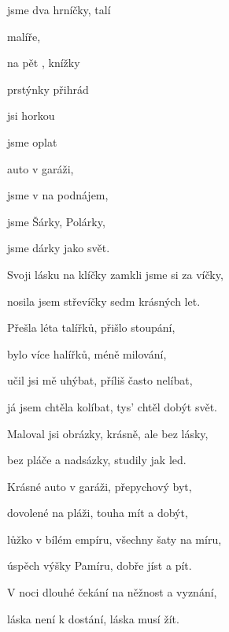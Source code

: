 

\zs
{} jsme dva hrníčky,  talí

   malíře,

 na pět ,  {knížky} 

 prstýnky   přihrád

\bigskip

 jsi   horkou 

 jsme   oplat 
\ks


\zr
{} auto v garáži,   

 jsme v   na podnájem,

 jsme  Šárky,  Polárky,

 jsme  dárky  jako svět.

\bigskip

Svoji lásku na klíčky zamkli jsme si za víčky,

nosila jsem střevíčky sedm krásných let.
\kr


\zs
Přešla léta talířků, přišlo stoupání,

bylo více halířků, méně milování,

učil jsi mě uhýbat, příliš často nelíbat,

já jsem chtěla kolíbat, tys' chtěl dobýt svět.

\bigskip

Maloval jsi obrázky, krásně, ale bez lásky,

bez pláče a nadsázky, studily jak led.
\ks

\zr
Krásné auto v garáži, přepychový byt,

dovolené na pláži, touha mít a dobýt,

lůžko v bílém empíru, všechny šaty na míru,

úspěch výšky Pamíru, dobře jíst a pít.

\bigskip

V noci dlouhé čekání na něžnost a vyznání,

láska není k dostání, láska musí žít.
\kr

